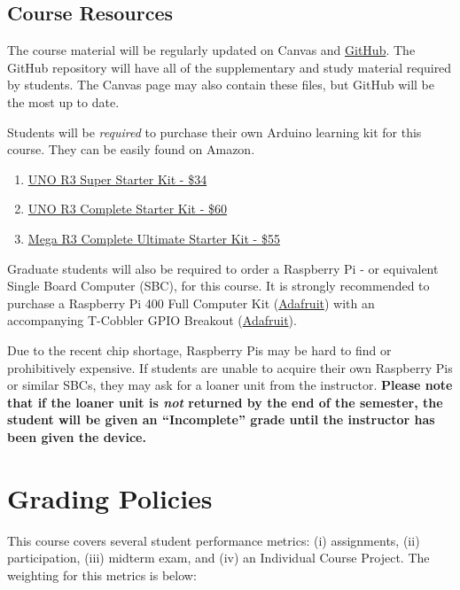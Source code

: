     \subsection*{Course Resources}
    The course material will be regularly updated on Canvas and \href{https://github.com/Legohead259/OCE4531-Material} {GitHub}. The GitHub repository will have all of the supplementary and study material required by students. The Canvas page may also contain these files, but GitHub will be the most up to date.
    
    Students will be \emph{required} to purchase their own Arduino learning kit for this course. They can be easily found on Amazon.
    
    \begin{enumerate}
        \item \href{https://www.amazon.com/ELEGOO-Project-Tutorial-Controller-Projects/dp/B01D8KOZF4}
        {UNO R3 Super Starter Kit - \$34}
        \item \href{https://www.amazon.com/EL-KIT-001-Project-Complete-Starter-Tutorial/dp/B01CZTLHGE} 
        {UNO R3 Complete Starter Kit - \$60}
        \item \href{https://www.amazon.com/EL-KIT-008-Project-Complete-Ultimate-TUTORIAL/dp/B01EWNUUUA}
        {Mega R3 Complete Ultimate Starter Kit - \$55}
    \end{enumerate}

    Graduate students will also be required to order a Raspberry Pi - or equivalent Single Board Computer (SBC), for this course. 
    It is strongly recommended to purchase a Raspberry Pi 400 Full Computer Kit (\href{https://www.adafruit.com/product/4796}{Adafruit}) with an accompanying T-Cobbler GPIO Breakout (\href{https://www.adafruit.com/product/2028}{Adafruit}).
    
    Due to the recent chip shortage, Raspberry Pis may be hard to find or prohibitively expensive. If students are unable to acquire their own Raspberry Pis or similar SBCs, they may ask for a loaner unit from the instructor. \textbf{Please note that if the loaner unit is \emph{not} returned by the end of the semester, the student will be given an ``Incomplete'' grade until the instructor has been given the device.}

\section*{Grading Policies}
This course covers several student performance metrics: (i) assignments, (ii) participation, (iii) midterm exam, and (iv) an Individual Course Project. The weighting for this metrics is below:

